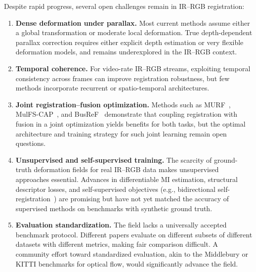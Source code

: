 Despite rapid progress, several open challenges remain in IR--RGB registration:

\begin{enumerate}
  \item \textbf{Dense deformation under parallax.} Most current methods assume
    either a global transformation or moderate local deformation. True
    depth-dependent parallax correction requires either explicit depth
    estimation or very flexible deformation models, and remains underexplored
    in the IR--RGB context.
  \item \textbf{Temporal coherence.} For video-rate IR--RGB streams, exploiting
    temporal consistency across frames can improve registration robustness, but
    few methods incorporate recurrent or spatio-temporal architectures.
  \item \textbf{Joint registration--fusion optimization.} Methods such as
    MURF~\cite{xu2023murf}, MulFS-CAP~\cite{mulfscap2025}, and
    BusReF~\cite{busref2025} demonstrate that coupling registration with fusion
    in a joint optimization yields benefits for both tasks, but the optimal
    architecture and training strategy for such joint learning remain open
    questions.
  \item \textbf{Unsupervised and self-supervised training.} The scarcity of
    ground-truth deformation fields for real IR--RGB data makes unsupervised
    approaches essential. Advances in differentiable MI estimation, structural
    descriptor losses, and self-supervised objectives (e.g., bidirectional
    self-registration~\cite{bi-directional-selfreg2025}) are promising but
    have not yet matched the accuracy of supervised methods on benchmarks with
    synthetic ground truth.
  \item \textbf{Evaluation standardization.} The field lacks a universally
    accepted benchmark protocol. Different papers evaluate on different
    subsets of different datasets with different metrics, making fair comparison
    difficult. A community effort toward standardized evaluation, akin to the
    Middlebury or KITTI benchmarks for optical flow, would significantly
    advance the field.
\end{enumerate}


